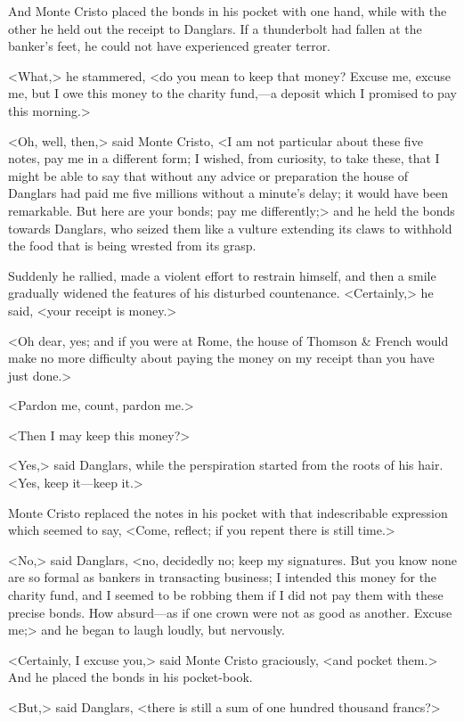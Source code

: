  And Monte Cristo placed the bonds in his pocket with one hand, while with the other he held out the receipt to Danglars. If a thunderbolt had fallen at the banker's feet, he could not have experienced greater terror. 

 <What,> he stammered, <do you mean to keep that money? Excuse me, excuse me, but I owe this money to the charity fund,—a deposit which I promised to pay this morning.> 

 <Oh, well, then,> said Monte Cristo, <I am not particular about these five notes, pay me in a different form; I wished, from curiosity, to take these, that I might be able to say that without any advice or preparation the house of Danglars had paid me five millions without a minute's delay; it would have been remarkable. But here are your bonds; pay me differently;> and he held the bonds towards Danglars, who seized them like a vulture extending its claws to withhold the food that is being wrested from its grasp. 

 Suddenly he rallied, made a violent effort to restrain himself, and then a smile gradually widened the features of his disturbed countenance.  <Certainly,> he said, <your receipt is money.> 

 <Oh dear, yes; and if you were at Rome, the house of Thomson \& French would make no more difficulty about paying the money on my receipt than you have just done.> 

 <Pardon me, count, pardon me.> 

 <Then I may keep this money?> 

 <Yes,> said Danglars, while the perspiration started from the roots of his hair. <Yes, keep it—keep it.> 

 Monte Cristo replaced the notes in his pocket with that indescribable expression which seemed to say, <Come, reflect; if you repent there is still time.> 

 <No,> said Danglars, <no, decidedly no; keep my signatures. But you know none are so formal as bankers in transacting business; I intended this money for the charity fund, and I seemed to be robbing them if I did not pay them with these precise bonds. How absurd—as if one crown were not as good as another. Excuse me;> and he began to laugh loudly, but nervously. 

 <Certainly, I excuse you,> said Monte Cristo graciously, <and pocket them.> And he placed the bonds in his pocket-book. 

 <But,> said Danglars, <there is still a sum of one hundred thousand francs?> 

